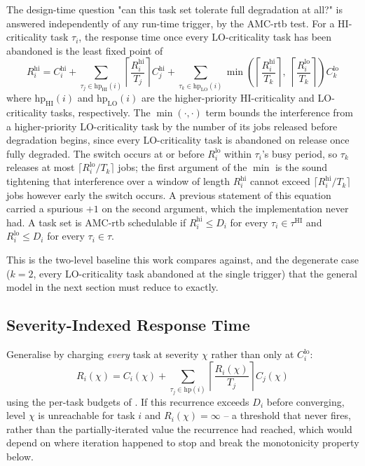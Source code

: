 The design-time question "can this task set tolerate full degradation at
all?" is answered independently of any run-time trigger, by the AMC-rtb test.
For a HI-criticality task $\tau_i$, the response time once every LO-criticality
task has been abandoned is the least fixed point of
\[
R_i^{\mathrm{hi}} = C_i^{\mathrm{hi}}
  + \sum_{\tau_j \in \mathrm{hp}_{\mathrm{HI}}(i)} \left\lceil \frac{R_i^{\mathrm{hi}}}{T_j} \right\rceil C_j^{\mathrm{hi}}
  + \sum_{\tau_k \in \mathrm{hp}_{\mathrm{LO}}(i)} \min\!\left( \left\lceil \frac{R_i^{\mathrm{hi}}}{T_k} \right\rceil,\; \left\lceil \frac{R_i^{\mathrm{lo}}}{T_k} \right\rceil \right) C_k^{\mathrm{lo}}
\]
where $\mathrm{hp}_{\mathrm{HI}}(i)$ and $\mathrm{hp}_{\mathrm{LO}}(i)$ are the
higher-priority HI-criticality and LO-criticality tasks, respectively. The
$\min(\cdot,\cdot)$ term bounds the interference from a higher-priority
LO-criticality task by the number of its jobs released before degradation
begins, since every LO-criticality task is abandoned on release once fully
degraded. The switch occurs at or before $R_i^{\mathrm{lo}}$ within $\tau_i$'s
busy period, so $\tau_k$ releases at most
$\lceil R_i^{\mathrm{lo}}/T_k \rceil$ jobs; the first argument of the $\min$ is
the sound tightening that interference over a window of length
$R_i^{\mathrm{hi}}$ cannot exceed $\lceil R_i^{\mathrm{hi}}/T_k \rceil$ jobs
however early the switch occurs. A previous statement of this equation carried
a spurious $+1$ on the second argument, which the implementation never had. A task set is AMC-rtb schedulable if $R_i^{\mathrm{hi}}
\leq D_i$ for every $\tau_i \in \tau^{\mathrm{HI}}$ and $R_i^{\mathrm{lo}} \leq
D_i$ for every $\tau_i \in \tau$.

This is the two-level baseline this work compares against, and the degenerate
case ($k = 2$, every LO-criticality task abandoned at the single trigger) that
the general model in the next section must reduce to exactly.

\subsection{Severity-Indexed Response Time}
\label{sec:severity-response}

Generalise  by charging \emph{every} task at severity $\chi$
rather than only at $C_i^{\mathrm{lo}}$:
\[
R_i(\chi) = C_i(\chi) + \sum_{\tau_j \in \mathrm{hp}(i)} \left\lceil \frac{R_i(\chi)}{T_j} \right\rceil C_j(\chi)
\]
using the per-task budgets of . If this recurrence
exceeds $D_i$ before converging, level $\chi$ is unreachable for task $i$ and
$R_i(\chi) = \infty$ -- a threshold that never fires, rather than the
partially-iterated value the recurrence had reached, which would depend on
where iteration happened to stop and break the monotonicity property below.

